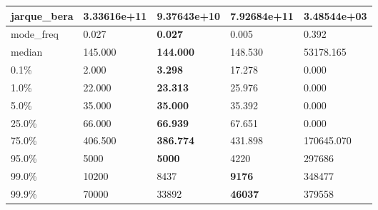 \begin{table}[H]
\begin{tabular}{|l|m{10em}|m{10em}|m{10em}|m{10em}|}
\hline jarque\_bera & 3.33616e+11 & \bfseries 9.37643e+10 & \cellcolor[rgb]{0.9, 0.54, 0.52} 7.92684e+11 & 3.48544e+03 \\
\hline mode\_freq & 0.027 & \bfseries 0.027 & 0.005 & \cellcolor[rgb]{0.9, 0.54, 0.52} 0.392 \\
\hline median & 145.000 & \bfseries 144.000 & 148.530 & \cellcolor[rgb]{0.9, 0.54, 0.52} 53178.165 \\
\hline 0.1\% & 2.000 & \bfseries 3.298 & \cellcolor[rgb]{0.9, 0.54, 0.52} 17.278 & 0.000 \\
\hline 1.0\% & 22.000 & \bfseries 23.313 & 25.976 & \cellcolor[rgb]{0.9, 0.54, 0.52} 0.000 \\
\hline 5.0\% & 35.000 & \bfseries 35.000 & 35.392 & \cellcolor[rgb]{0.9, 0.54, 0.52} 0.000 \\
\hline 25.0\% & 66.000 & \bfseries 66.939 & 67.651 & \cellcolor[rgb]{0.9, 0.54, 0.52} 0.000 \\
\hline 75.0\% & 406.500 & \bfseries 386.774 & 431.898 & \cellcolor[rgb]{0.9, 0.54, 0.52} 170645.070 \\
\hline 95.0\% & 5000 & \bfseries 5000 & 4220 & \cellcolor[rgb]{0.9, 0.54, 0.52} 297686 \\
\hline 99.0\% & 10200 & 8437 & \bfseries 9176 & \cellcolor[rgb]{0.9, 0.54, 0.52} 348477 \\
\hline 99.9\% & 70000 & 33892 & \bfseries 46037 & \cellcolor[rgb]{0.9, 0.54, 0.52} 379558 \\
\hline
\end{tabular}
\end{table}
